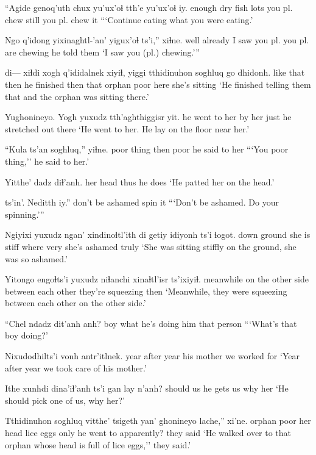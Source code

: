 \documentclass[12pt]{article}
\begin{document}
\gll ``Agide genoq'uth chux yu'ux'oɬ tth'e yu'ux'oɬ      iy. 
enough   {dry fish} lots {you pl. chew} still {you pl. chew} it
\glt ```Continue eating what you were eating.'
\glend

\gll Ngo  q'idong yixinaghtl-'an' yigux'oɬ ts'i,'' xiɬne.
well already {I saw you pl.} {you pl. are chewing} {} {he told them}
\glt `I saw you (pl.) chewing.'''
\glend

 di--- xiɬdi {xogh q'ididalnek} xiyiɬ,  yiggi tthidinuhon soghluq go   dhidonh.
{like that} {}   then  {he finished}      then   that  orphan      poor    here {she's sitting}
\glt `He finished telling them that and the orphan was sitting there.'
\glend

\gll Yughonineyo.    Yogh yuxudz tth'aghthiggisr   yit.
{he went to her}  {by her} just  {he stretched out} there
\glt `He went to her. He lay on the floor near her.'
\glend

\gll ``Kula       ts'an    soghluq,'' yiɬne.
{poor thing} then  poor    {he said to her}
\glt ```You poor thing,'' he said to her.'
\glend
 
\gll Yitthe'  dadz diɬ'anh.
{her head} thus {he does}
\glt `He patted her on the head.'
\glend

 ts'in'. Neditth iy.''
{don't be ashamed} {}     spin    it
\glt ```Don't be ashamed. Do your spinning.'''
\glend

\gll Ngiyixi yuxudz ngan'  xindinoɬtl'ith di getiy idiyonh ts'i ɬogot.
down     {}  ground {she is stiff} where very  {she's ashamed} {} truly
\glt `She was sitting stiffly on the ground, she was so ashamed.'
\glend

\gll Yitongo   engoɬts'i yuxudz niɬanchi           xinaɬtl'isr       ts'ixiyiɬ.
meanwhile {on the other side} {} {between each other} {they're squeezing} then
\glt `Meanwhile, they were squeezing between each other on the other side.'
\glend

\gll ``Chel ndadz dit'anh    anh?
boy  what  {he's doing him} {that person}
\glt ```What's that boy doing?'
\glend

\gll Nixudodhilts'i  vonh       antr'itlnek. 
{year after year} {his mother} {we worked for} 
\glt `Year after year we took care of his mother.'
\glend

\gll Ithe   xunhdi dina'iɬ'anh ts'i  {gan lay} n'anh?
should   us   {he gets us} {}   why    her
\glt `He should pick one of us, why her?'
\glend

\gll Tthidinuhon soghluq vitthe'  tsigeth   yan' ghonineyo  lache,'' xi'ne.
orphan      poor    {her head} {lice eggs} only {he went to}  apparently?  {they said}
\glt `He walked over to that orphan whose head is full of lice eggs,'' they said.'
\glend
\end{document}
